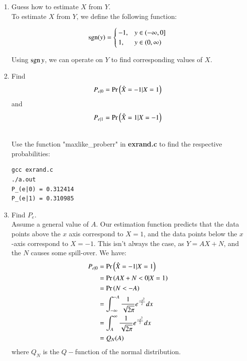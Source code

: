 \documentclass[journal,12pt,twocolumn]{IEEEtran}
\renewcommand\thesection{\arabic{section}}
\begin{document}
\begin{enumerate}[label=\thesection.\arabic*
    ,ref=\thesection.\theenumi]
    Y is plotted in Fig. \ref{fig:noise}  




    \item Guess how to estimate $X$ from $Y$.
\\
\solution To estimate $X$ from $Y$, we define the following function:

\begin{align}
    \mathop{\mathrm{sgn}}(y) = 
    \begin{cases}
        -1, & y \in (-\infty,0] \\
        1, & y \in (0, \infty)
    \end{cases}
\end{align}

Using $\mathop{\mathrm{sgn}}{y}$, we can operate on $Y$ to find corresponding values of $X$.




\item
\label{ml-ch4_sim}
Find 
\begin{equation}
	P_{e|0} = \Pr\left(\hat{X} = -1|X=1\right)
\end{equation}
and 
\begin{equation}
	P_{e|1} = \Pr\left(\hat{X} = 1|X=-1\right)
\end{equation}

\\
\solution Use the function "maxlike\_proberr" in \textbf{exrand.c} to find the respective probabilities:

\begin{lstlisting}
gcc exrand.c
./a.out
P_(e|0) = 0.312414
P_(e|1) = 0.310985
\end{lstlisting}




\item Find $P_e$.
\\
\solution
Assume a general value of $A$. Our estimation function predicts that the data points above the $x$ axis
correspond to $X=1$, and the data points below the $x$-axis correspond to $X=-1$. This isn't always the case,
as $Y=AX+N$, and the $N$ causes some spill-over.
We have:
\begin{align}
    P_{e|0} &= \Pr\left(\hat{X} = -1|X=1\right) \\
    &= \Pr\left(AX+N<0|X=1\right) \\
    &= \Pr\left(N<-A\right) \\
    &= \int_{-\infty} ^{-A} \frac{1}{\sqrt{2\pi}} e^{\frac{-x^2}{2}} dx \\
    &= \int_{A} ^{\infty} \frac{1}{\sqrt{2\pi}} e^{\frac{-x^2}{2}} dx \\
    &= Q_N(A)
\end{align}
where $Q_N$ is the $Q-$function of the normal distribution.


\end{enumerate}
\end{document}
